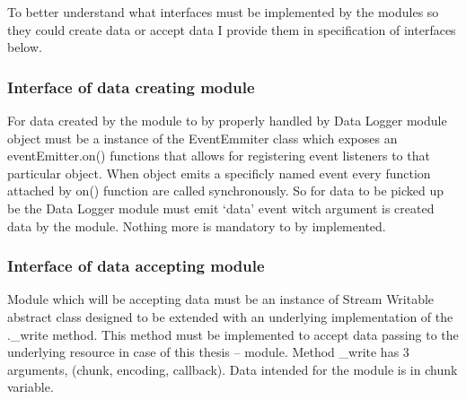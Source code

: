 To better understand what interfaces must be implemented by the modules so they could create data or accept data I provide them in specification of interfaces below.
\subsubsection{Interface of data creating module} %
\label{ssub:interface_of_data_creating_module}
For data created by the module to by properly handled by Data Logger module object must be a instance of the EventEmmiter class which exposes an eventEmitter.on() functions that allows for registering event listeners to that particular object. When object emits a specificly named event every function attached by on() function are called synchronously. So for data to be picked up be the Data Logger module must emit `data' event witch argument is created data by the module. Nothing more is mandatory to by implemented.

\subsubsection{Interface of data accepting module} %
\label{ssub:interface_of_data_accepting_module}
Module which will be accepting data must be an instance of Stream Writable abstract class designed to be extended with an underlying implementation of the .\_write method. This method must be implemented to accept data passing to the underlying resource in case of this thesis -- module. Method \_write  has 3 arguments, (chunk, encoding, callback). Data intended for the module is in chunk variable.



